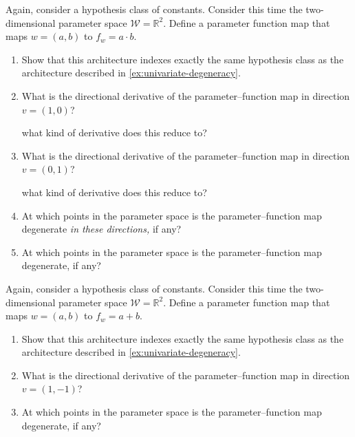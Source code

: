 \documentclass[11pt]{article}
\newcommand{\R}{\mathbb{R}}
\newcommand{\W}{\mathcal{W}}
\begin{document}
\begin{exercise}
\label{ex:product-degeneracy}
Again, consider a hypothesis class of constants. Consider this time the two-dimensional parameter space $\W = \R^2$. Define a parameter function map that maps $w = (a, b)$ to $f_w = a \cdot b$.
\begin{enumerate}
    \item
        Show that this architecture indexes exactly the same hypothesis class
        as the architecture described in \cref{ex:univariate-degeneracy}.
    \item
        What is the directional derivative of the parameter--function map in
        direction $v = (1, 0)$?
        \begin{hint}
what kind of derivative does this reduce to?
        \end{hint}
    \item
        What is the directional derivative of the parameter--function map in
        direction $v = (0, 1)$?
        \begin{hint}
what kind of derivative does this reduce to?
        \end{hint}
    \item \label{ex:product-degeneracy:axes-directions}
        At which points in the parameter space is the parameter--function map
        degenerate \emph{in these directions,} if any?
    \item
        At which points in the parameter space is the parameter--function map
        degenerate, if any?
\end{enumerate}
\end{exercise}

\begin{exercise}
\label{ex:sum-degeneracy}
Again, consider a hypothesis class of constants. Consider this time the two-dimensional parameter space $\W = \R^2$. Define a parameter function map that maps $w = (a, b)$ to $f_w = a + b$.
\begin{enumerate}
    \item Show that this architecture indexes exactly the same hypothesis class as the architecture described in \cref{ex:univariate-degeneracy}.
    \item What is the directional derivative of the parameter--function map in
        direction $v = (1, -1)$?
    \item At which points in the parameter space is the parameter--function map degenerate, if any?
\end{enumerate}
\end{exercise}
\end{document}
